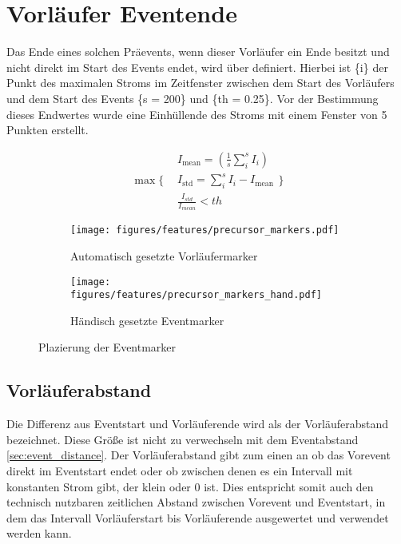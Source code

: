 \section{Vorläufer Eventende}
\label{sec.preeventend}
Das Ende eines solchen Präevents, wenn dieser Vorläufer ein Ende besitzt und nicht direkt im Start des Events endet, wird über  definiert. Hierbei ist \{i\} der Punkt des maximalen Stroms im Zeitfenster zwischen dem Start des Vorläufers und dem Start des Events \{s = 200\} und \{th = 0.25\}. Vor der Bestimmung dieses Endwertes wurde eine Einhüllende des Stroms mit einem Fenster von 5 Punkten erstellt.

\begin{equation}
\max \Bigg\{
\begin{aligned}
&  I_{\text{mean}} = (\frac{1}{s}\sum_i^{s} I_i) \\ 
& I_{\text{std}} = \sum_i^s I_i - I_{\text{mean}} \\ 
& \frac{I_{std}}{I_{mean}} < th
\end{aligned}
\Bigg\}
\label{eq:precursor_end}
\end{equation}

\begin{figure}[H]
  \centering
  \begin{subfigure}[t]{0.48\textwidth}
    \centering
    \texttt{[image: figures/features/precursor\_markers.pdf]}
    \caption{Automatisch gesetzte Vorläufermarker}
    \label{fig:precursor_markers_auto}
  \end{subfigure}
  \begin{subfigure}[t]{0.48\textwidth}
    \centering
    \texttt{[image: figures/features/precursor\_markers\_hand.pdf]}
    \caption{Händisch gesetzte Eventmarker}
    \label{fig:precursor_markers_hand}
  \end{subfigure}
  \caption{Plazierung der Eventmarker}
  \label{fig:precursor_markers}
\end{figure}

\subsection{Vorläuferabstand}
\label{sec:precursor_distance}
Die Differenz aus Eventstart und Vorläuferende wird als der Vorläuferabstand bezeichnet. Diese Größe ist nicht zu verwechseln mit dem Eventabstand \ref{sec:event_distance}. Der Vorläuferabstand gibt zum einen an ob das Vorevent direkt im Eventstart endet oder ob zwischen denen es ein Intervall mit konstanten Strom gibt, der klein oder 0 ist. Dies entspricht somit auch den technisch nutzbaren zeitlichen Abstand zwischen Vorevent und Eventstart, in dem das Intervall Vorläuferstart bis Vorläuferende ausgewertet und verwendet werden kann.



